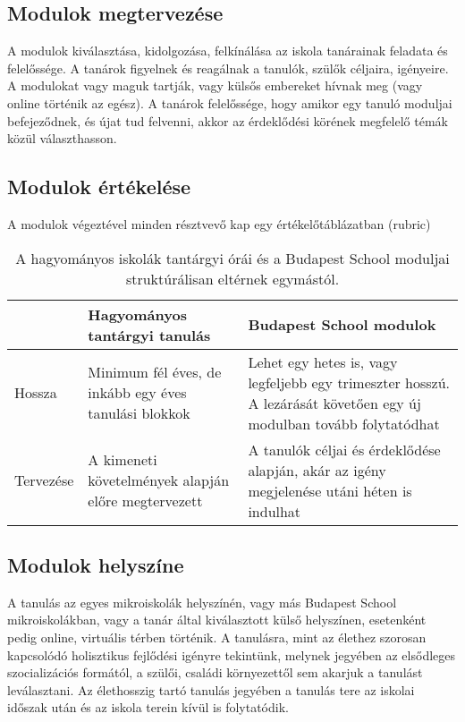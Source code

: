 \subsection{ Modulok megtervezése}

A modulok kiválasztása, kidolgozása, felkínálása az iskola tanárainak feladata és felelőssége. A tanárok figyelnek és reagálnak a tanulók, szülők céljaira, igényeire. A modulokat vagy maguk tartják, vagy külsős embereket hívnak meg (vagy online történik az egész). A tanárok felelőssége, hogy amikor egy tanuló moduljai befejeződnek, és újat tud felvenni, akkor az érdeklődési körének megfelelő témák közül választhasson.

\subsection{Modulok értékelése}
A modulok végeztével minden résztvevő kap egy értékelőtáblázatban (rubric)

\begin{table}[h]
\centering
\begin{tabular}{@{}p{1.5cm}|p{4cm}|p{4cm}@{}}

& \textbf{Hagyományos tantárgyi tanulás}  & \textbf{ Budapest School modulok}
\\ \hline
   Hossza &
   Minimum fél éves, de inkább egy éves tanulási blokkok &
   Lehet egy hetes is, vagy legfeljebb egy trimeszter hosszú. A lezárását követően egy új modulban tovább folytatódhat \\ \hline
Tervezése & A kimeneti követelmények alapján előre megtervezett &
 A tanulók céljai és érdeklődése alapján, akár az igény megjelenése utáni héten is indulhat\\ \hline

\end{tabular}
\caption{A hagyományos iskolák tantárgyi órái és a Budapest School moduljai struktúrálisan eltérnek egymástól.}

\label{tanorak-vs-modulok}

\end{table}



\subsection{ Modulok helyszíne}

A tanulás az egyes mikroiskolák helyszínén, vagy más Budapest School mikroiskolákban, vagy a tanár által kiválasztott külső helyszínen, esetenként pedig online, virtuális térben történik. A tanulásra, mint az élethez szorosan kapcsolódó holisztikus fejlődési igényre tekintünk, melynek jegyében az elsődleges szocializációs formától, a szülői, családi környezettől sem akarjuk a tanulást leválasztani. Az élethosszig tartó tanulás jegyében a tanulás tere az iskolai időszak után és az iskola terein kívül is folytatódik.

